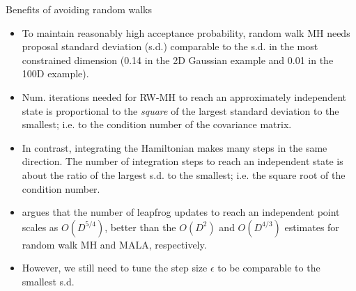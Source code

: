 \documentclass[aspectratio=169]{beamer}
\begin{document}
\begin{frame}{Benefits of avoiding random walks}
    
\begin{itemize}
    \item To maintain reasonably high acceptance probability, random walk MH needs proposal standard deviation (s.d.) comparable to the s.d. in the most constrained dimension (0.14 in the 2D Gaussian example and 0.01 in the 100D example).
    
    \item Num. iterations needed for RW-MH to reach an approximately independent state is proportional to the \emph{square} of the largest standard deviation to the smallest; i.e. to the condition number of the covariance matrix. 
    
    \item In contrast, integrating the Hamiltonian makes many steps in the same direction. The number of integration steps to reach an independent state is about the ratio of the largest s.d. to the smallest; i.e. the square root of the condition number.
    
    \item \citet{Neal2012-ev} argues that the number of leapfrog updates to reach an independent point scales as $O(D^{5/4})$, better than the $O(D^2)$ and $O(D^{4/3})$ estimates for random walk MH and MALA, respectively. 
    
    \item However, we still need to tune the step size $\epsilon$ to be comparable to the smallest s.d. 
    
\end{itemize}
    
\end{frame}
\end{document}
